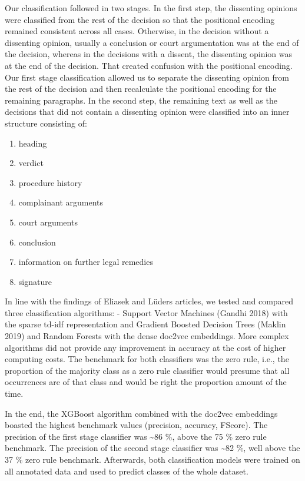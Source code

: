 \documentclass[
  11pt,
]{article}
\providecommand{\tightlist}{%
  \setlength{\itemsep}{0pt}\setlength{\parskip}{0pt}}
\begin{document}
Our classification followed in two stages. In the first step, the
dissenting opinions were classified from the rest of the decision so
that the positional encoding remained consistent across all cases.
Otherwise, in the decision without a dissenting opinion, usually a
conclusion or court argumentation was at the end of the decision,
whereas in the decisions with a dissent, the dissenting opinion was at
the end of the decision. That created confusion with the positional
encoding. Our first stage classification allowed us to separate the
dissenting opinion from the rest of the decision and then recalculate
the positional encoding for the remaining paragraphs. In the second
step, the remaining text as well as the decisions that did not contain a
dissenting opinion were classified into an inner structure consisting
of:

\begin{enumerate}
\def\labelenumi{(\arabic{enumi})}
\tightlist
\item
  heading
\item
  verdict
\item
  procedure history
\item
  complainant arguments
\item
  court arguments
\item
  conclusion
\item
  information on further legal remedies
\item
  signature
\end{enumerate}

In line with the findings of Eliasek and Lüders articles, we tested and
compared three classification algorithms: - Support Vector Machines
(Gandhi 2018) with the sparse td-idf representation and Gradient Boosted
Decision Trees (Maklin 2019) and Random Forests with the dense doc2vec
embeddings. More complex algorithms did not provide any improvement in
accuracy at the cost of higher computing costs. The benchmark for both
classifiers was the zero rule, i.e., the proportion of the majority
class as a zero rule classifier would presume that all occurrences are
of that class and would be right the proportion amount of the time.

In the end, the XGBoost algorithm combined with the doc2vec embeddings
boasted the highest benchmark values (precision, accuracy, FScore). The
precision of the first stage classifier was \textasciitilde86 \%, above
the 75 \% zero rule benchmark. The precision of the second stage
classifier was \textasciitilde82 \%, well above the 37 \% zero rule
benchmark. Afterwards, both classification models were trained on all
annotated data and used to predict classes of the whole dataset.
\end{document}
